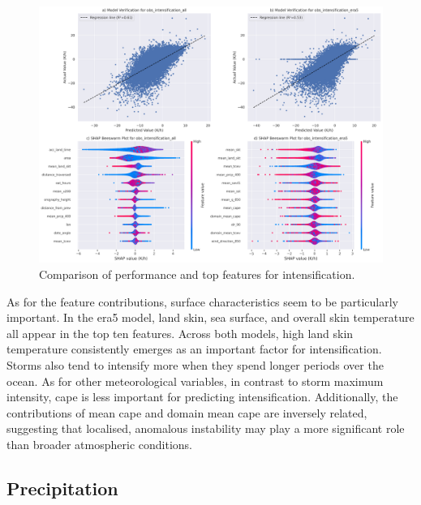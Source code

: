 \begin{figure}[ht]
    \centering
    \includegraphics[width=\textwidth]{../figures/generated/experiments/obs_intensification/obs_intensification_summary.png}
    \caption{Comparison of performance and top features for intensification.}
    \label{fig:obs_intensification_summary}
\end{figure}

As for the feature contributions, surface characteristics seem to be particularly important. In the \acrshort{era5} model, land skin, sea surface, and overall skin temperature all appear in the top ten features. Across both models, high land skin temperature consistently emerges as an important factor for intensification. Storms also tend to intensify more when they spend longer periods over the ocean. As for other meteorological variables, in contrast to storm maximum intensity, \acrshort{cape} is less important for predicting intensification. Additionally, the contributions of mean \acrshort{cape} and domain mean \acrshort{cape} are inversely related, suggesting that localised, anomalous instability may play a more significant role than broader atmospheric conditions.


\clearpage
\subsection{Precipitation}

